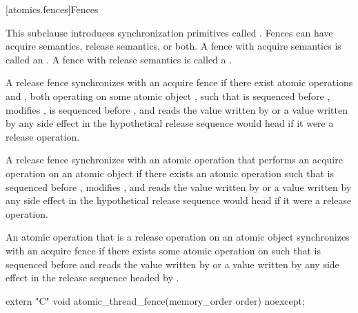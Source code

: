 [atomics.fences]{Fences}

\pnum
This subclause introduces synchronization primitives called . Fences can have
acquire semantics, release semantics, or both. A fence with acquire semantics is called
an . A fence with release semantics is called a .

\pnum
A release fence  synchronizes with an acquire fence  if there exist
atomic operations  and , both operating on some atomic object
, such that  is sequenced before ,  modifies
,  is sequenced before , and  reads the value
written by  or a value written by any side effect in the hypothetical release
sequence  would head if it were a release operation.

\pnum
A release fence  synchronizes with an atomic operation  that
performs an acquire operation on an atomic object  if there exists an atomic
operation  such that  is sequenced before , 
modifies , and  reads the value written by  or a value
written by any side effect in the hypothetical release sequence  would head if
it were a release operation.

\pnum
An atomic operation  that is a release operation on an atomic object
 synchronizes with an acquire fence  if there exists some atomic
operation  on  such that  is sequenced before 
and reads the value written by  or a value written by any side effect in the
release sequence headed by .

%
\begin{itemdecl}
extern "C" void atomic_thread_fence(memory_order order) noexcept;
\end{itemdecl}

